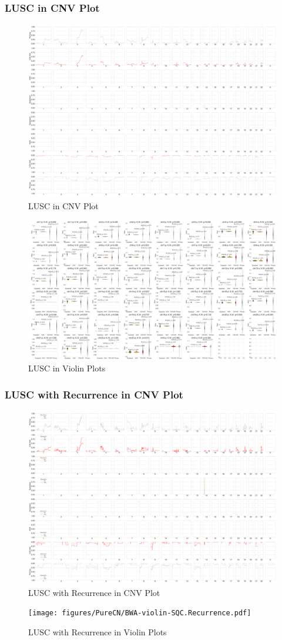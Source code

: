 \documentclass{beamer}
\begin{document}
    \begin{frame}[allowframebreaks]
        \frametitle{LUSC in CNV Plot}

        \begin{figure}
            \includegraphics[width=0.6 \linewidth]{figures/PureCN/BWA-simple-SQC.pdf}
            \caption{LUSC in CNV Plot}
        \end{figure}

        \begin{figure}
            \includegraphics[width=0.8 \linewidth]{figures/PureCN/BWA-violin-SQC.pdf}
            \caption{LUSC in Violin Plots}
        \end{figure}
    \end{frame}

    \begin{frame}[allowframebreaks]
        \frametitle{LUSC with Recurrence in CNV Plot}

        \begin{figure}
            \includegraphics[width=0.6 \linewidth]{figures/PureCN/BWA-simple-SQC.Recurrence.pdf}
            \caption{LUSC with Recurrence in CNV Plot}
        \end{figure}

        \begin{figure}
            \texttt{[image: figures/PureCN/BWA-violin-SQC.Recurrence.pdf]}
            \caption{LUSC with Recurrence in Violin Plots}
        \end{figure}
    \end{frame}
\end{document}
